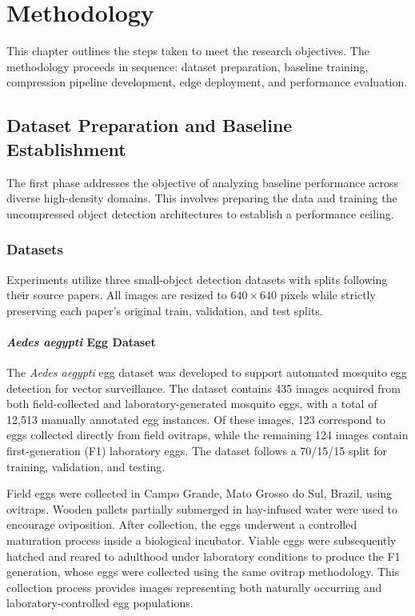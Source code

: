 \chapter{Methodology}
\label{sec:methodology}

This chapter outlines the steps taken to meet the research objectives. The methodology proceeds in sequence: dataset preparation, baseline training, compression pipeline development, edge deployment, and performance evaluation.

\section{Dataset Preparation and Baseline Establishment}
The first phase addresses the objective of analyzing baseline performance across diverse high-density domains. This involves preparing the data and training the uncompressed object detection architectures to establish a performance ceiling.

\subsection{Datasets}
Experiments utilize three small-object detection datasets with splits following their source papers. All images are resized to $640\times640$ pixels while strictly preserving each paper's original train, validation, and test splits.

\subsubsection{\textit{Aedes aegypti} Egg Dataset}

The \textit{Aedes aegypti} egg dataset \cite{vicente2024aedesaegyptieggcounting} was developed to support automated mosquito egg detection for vector surveillance. The dataset contains 435 images acquired from both field-collected and laboratory-generated mosquito eggs, with a total of 12,513 manually annotated egg instances. Of these images, 123 correspond to eggs collected directly from field ovitraps, while the remaining 124 images contain first-generation (F1) laboratory eggs. The dataset follows a 70/15/15 split for training, validation, and testing.

Field eggs were collected in Campo Grande, Mato Grosso do Sul, Brazil, using ovitraps. Wooden pallets partially submerged in hay-infused water were used to encourage oviposition. After collection, the eggs underwent a controlled maturation process inside a biological incubator. Viable eggs were subsequently hatched and reared to adulthood under laboratory conditions to produce the F1 generation, whose eggs were collected using the same ovitrap methodology. This collection process provides images representing both naturally occurring and laboratory-controlled egg populations.

